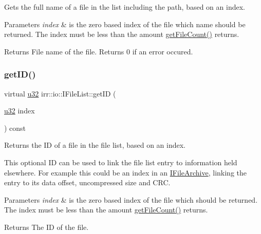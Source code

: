Gets the full name of a file in the list including the path, based on an index. 


\begin{DoxyParams}{Parameters}
{\em index} & is the zero based index of the file which name should be returned. The index must be less than the amount \hyperlink{classirr_1_1io_1_1IFileList_a871861be76e18d58274c4580b1d103b9}{get\+File\+Count()} returns. \\
\hline
\end{DoxyParams}
\begin{DoxyReturn}{Returns}
File name of the file. Returns 0 if an error occured. 
\end{DoxyReturn}
\mbox{\label{classirr_1_1io_1_1IFileList_a9f633344aa2bb36f619d1ca8472b46b6}} 
\subsubsection{\texorpdfstring{get\+I\+D()}{getID()}\hspace{0.1cm}{\footnotesize\ttfamily [1/2]}}
{\footnotesize\ttfamily virtual \hyperlink{namespaceirr_a0416a53257075833e7002efd0a18e804}{u32} irr\+::io\+::\+I\+File\+List\+::get\+ID (\begin{DoxyParamCaption}\item[{\hyperlink{namespaceirr_a0416a53257075833e7002efd0a18e804}{u32}}]{index }\end{DoxyParamCaption}) const\hspace{0.3cm}{\ttfamily [pure virtual]}}



Returns the ID of a file in the file list, based on an index. 

This optional ID can be used to link the file list entry to information held elsewhere. For example this could be an index in an \hyperlink{classirr_1_1io_1_1IFileArchive}{I\+File\+Archive}, linking the entry to its data offset, uncompressed size and C\+RC. 
\begin{DoxyParams}{Parameters}
{\em index} & is the zero based index of the file which should be returned. The index must be less than the amount \hyperlink{classirr_1_1io_1_1IFileList_a871861be76e18d58274c4580b1d103b9}{get\+File\+Count()} returns. \\
\hline
\end{DoxyParams}
\begin{DoxyReturn}{Returns}
The ID of the file. 
\end{DoxyReturn}
\mbox{\label{classirr_1_1io_1_1IFileList_a9f633344aa2bb36f619d1ca8472b46b6}} 
